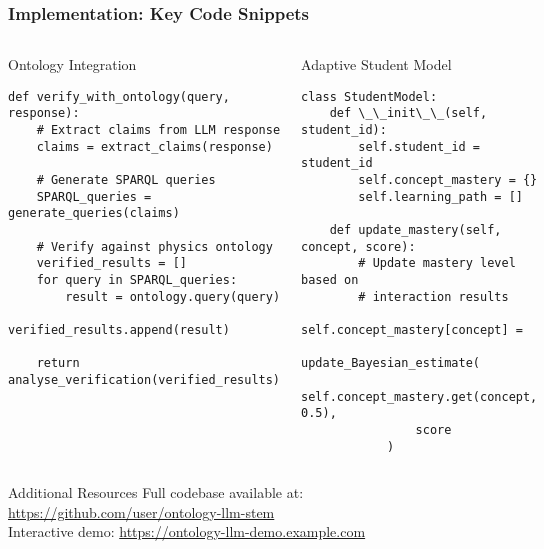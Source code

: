 \begin{frame}[fragile]
\frametitle{Implementation: Key Code Snippets}

\begin{columns}

\begin{block}{Ontology Integration}
\begin{verbatim}
def verify_with_ontology(query, response):
    # Extract claims from LLM response
    claims = extract_claims(response)
    
    # Generate SPARQL queries
    SPARQL_queries = generate_queries(claims)
    
    # Verify against physics ontology
    verified_results = []
    for query in SPARQL_queries:
        result = ontology.query(query)
        verified_results.append(result)
        
    return analyse_verification(verified_results)
\end{verbatim}
\end{block}

\begin{block}{Adaptive Student Model}
\begin{verbatim}
class StudentModel:
    def \_\_init\_\_(self, student_id):
        self.student_id = student_id
        self.concept_mastery = {}
        self.learning_path = []
        
    def update_mastery(self, concept, score):
        # Update mastery level based on
        # interaction results
        self.concept_mastery[concept] = 
            update_Bayesian_estimate(
                self.concept_mastery.get(concept, 0.5),
                score
            )
\end{verbatim}
\end{block}

\end{columns}

\begin{alertblock}{Additional Resources}
Full codebase available at: \url{https://github.com/user/ontology-llm-stem}\\
Interactive demo: \url{https://ontology-llm-demo.example.com}
\end{alertblock}
\end{frame}
